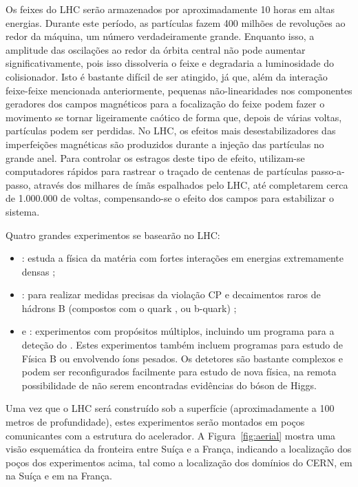 Os feixes do LHC serão armazenados por aproximadamente 10 horas em altas
energias. Durante este período, as partículas fazem 400 milhões de revoluções
ao redor da máquina, um número verdadeiramente grande. Enquanto isso, a
amplitude das oscilações ao redor da órbita central não pode aumentar
significativamente, pois isso dissolveria o feixe e degradaria a luminosidade
do colisionador. Isto é bastante difícil de ser atingido, já que, além da
interação feixe-feixe mencionada anteriormente, pequenas não-linearidades nos
componentes geradores dos campos magnéticos para a focalização do feixe podem
fazer o movimento se tornar ligeiramente caótico de forma que, depois de
várias voltas, partículas podem ser perdidas. No LHC, os efeitos mais
desestabilizadores das imperfeições magnéticas são produzidos durante a
injeção das partículas no grande anel. Para controlar os estragos deste tipo
de efeito, utilizam-se computadores rápidos para rastrear o traçado de
centenas de partículas passo-a-passo, através dos milhares de ímãs espalhados
pelo LHC, até completarem cerca de 1.000.000 de voltas, compensando-se o
efeito dos campos para estabilizar o sistema.

Quatro grandes experimentos se basearão no LHC:

\begin{itemize}

\item {}: estuda a física da matéria com fortes interações
em energias extremamente densas \cite{alice};

\item {}: para realizar medidas precisas da violação CP e
decaimentos raros de hádrons B (compostos com o quark , ou
b-quark) \cite{lhcb};

\item {} \cite{atlas-site} e  \cite{cms}:
experimentos com propósitos múltiplos, incluindo um programa para a deteção do
. Estes experimentos também incluem programas para estudo
de Física B ou envolvendo íons pesados. Os detetores são bastante complexos e
podem ser reconfigurados facilmente para estudo de nova física, na remota
possibilidade de não serem encontradas evidências do bóson de Higgs.

\end{itemize}

Uma vez que o LHC será construído sob a superfície (aproximadamente a 100
metros de profundidade), estes experimentos serão montados em poços
comunicantes com a estrutura do acelerador. A Figura~\ref{fig:aerial} mostra
uma visão esquemática da fronteira entre Suíça e a França, indicando a
localização dos poços dos experimentos acima, tal como a localização dos
domínios do CERN, em
 na Suíça e em  na França.

